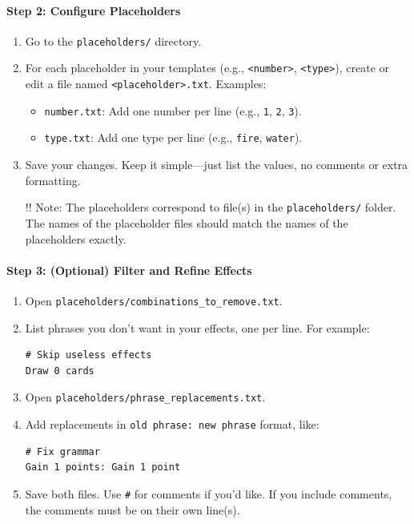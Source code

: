 \paragraph{Step 2: Configure Placeholders}
\begin{enumerate}
	\item Go to the \texttt{placeholders/} directory.
	\item For each placeholder in your templates (e.g., \texttt{<number>}, \texttt{<type>}), create or edit a file named \texttt{<placeholder>.txt}. Examples:
	\begin{itemize}
		\item \texttt{number.txt}: Add one number per line (e.g., \texttt{1}, \texttt{2}, \texttt{3}).
		\item \texttt{type.txt}: Add one type per line (e.g., \texttt{fire}, \texttt{water}).
	\end{itemize}
	\item Save your changes. Keep it simple—just list the values, no comments or extra formatting.
	\item[!!] Note: The placeholders correspond to file(s) in the \texttt{placeholders/} folder. The names of the placeholder files should match the names of the placeholders exactly.
\end{enumerate}

\paragraph{Step 3: (Optional) Filter and Refine Effects}
\begin{enumerate}
	\item Open \texttt{placeholders/combinations\_to\_remove.txt}.
	\item List phrases you don’t want in your effects, one per line. For example:
\begin{lstlisting}
# Skip useless effects
Draw 0 cards
\end{lstlisting}
	\item Open \texttt{placeholders/phrase\_replacements.txt}.
	\item Add replacements in \texttt{old phrase: new phrase} format, like:
\begin{lstlisting}
# Fix grammar
Gain 1 points: Gain 1 point
\end{lstlisting}
	\item Save both files. Use \texttt{\#} for comments if you’d like. If you include comments, the comments must be on their own line(s).
\end{enumerate}


